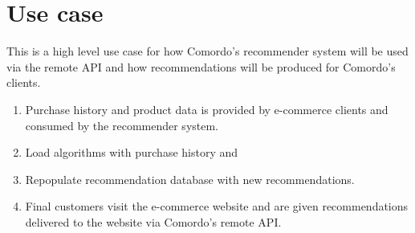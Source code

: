 
\section{Use case}\label{sec:use}

This is a high level use case for how Comordo's recommender system will be used via the remote API and how recommendations will be produced for Comordo's clients.

\begin{enumerate}
    \item Purchase history and product data is provided by e-commerce clients and consumed by the recommender system.
    \item Load algorithms with purchase history and 
    \item Repopulate recommendation database with new recommendations.
    \item Final customers visit the e-commerce website and are given recommendations delivered to the website via Comordo's remote API.
\end{enumerate}

